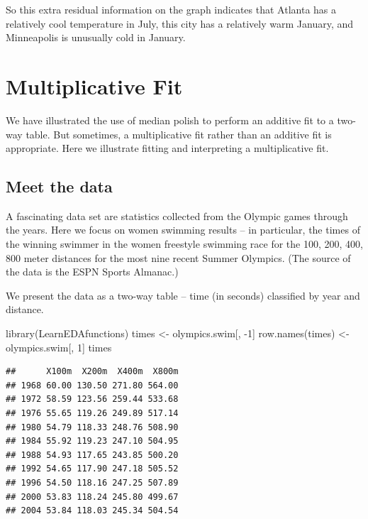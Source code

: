\documentclass[
]{book}
\newenvironment{Shaded}{\begin{snugshade}}{\end{snugshade}}
\newcommand{\DecValTok}[1]{\textcolor[rgb]{0.00,0.00,0.81}{#1}}
\newcommand{\FunctionTok}[1]{\textcolor[rgb]{0.00,0.00,0.00}{#1}}
\newcommand{\NormalTok}[1]{#1}
\newcommand{\OtherTok}[1]{\textcolor[rgb]{0.56,0.35,0.01}{#1}}
\newcommand{\SpecialCharTok}[1]{\textcolor[rgb]{0.00,0.00,0.00}{#1}}
\begin{document}
So this extra residual information on the graph indicates that Atlanta has a relatively cool temperature in July, this city has a relatively warm January, and Minneapolis is unusually cold in January.

\hypertarget{multiplicative-fit}{%
\chapter{Multiplicative Fit}\label{multiplicative-fit}}

We have illustrated the use of median polish to perform an additive fit to a two-way table. But sometimes, a multiplicative fit rather than an additive fit is appropriate. Here we illustrate fitting and interpreting a multiplicative fit.

\hypertarget{meet-the-data-7}{%
\section{Meet the data}\label{meet-the-data-7}}

A fascinating data set are statistics collected from the Olympic games through the years. Here we focus on women swimming results -- in particular, the times of the winning swimmer in the women freestyle swimming race for the 100, 200, 400, 800 meter distances for the most nine recent Summer Olympics. (The source of the data is the ESPN Sports Almanac.)

We present the data as a two-way table -- time (in seconds) classified by year and distance.

\begin{Shaded}
\begin{Highlighting}[]
\FunctionTok{library}\NormalTok{(LearnEDAfunctions)}
\NormalTok{times }\OtherTok{\textless{}{-}}\NormalTok{ olympics.swim[, }\SpecialCharTok{{-}}\DecValTok{1}\NormalTok{]}
\FunctionTok{row.names}\NormalTok{(times) }\OtherTok{\textless{}{-}}\NormalTok{ olympics.swim[, }\DecValTok{1}\NormalTok{]}
\NormalTok{times}
\end{Highlighting}
\end{Shaded}

\begin{verbatim}
##      X100m  X200m  X400m  X800m
## 1968 60.00 130.50 271.80 564.00
## 1972 58.59 123.56 259.44 533.68
## 1976 55.65 119.26 249.89 517.14
## 1980 54.79 118.33 248.76 508.90
## 1984 55.92 119.23 247.10 504.95
## 1988 54.93 117.65 243.85 500.20
## 1992 54.65 117.90 247.18 505.52
## 1996 54.50 118.16 247.25 507.89
## 2000 53.83 118.24 245.80 499.67
## 2004 53.84 118.03 245.34 504.54
\end{verbatim}
\end{document}
